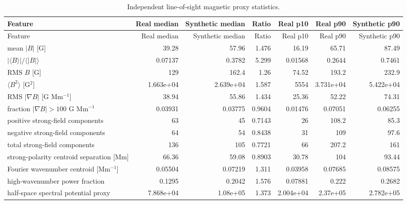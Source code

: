 \scriptsize
\setlength{\tabcolsep}{2pt}
\begin{longtable}{p{}rrrrrr}
\caption{Independent line-of-sight magnetic proxy statistics.}\label{tab:physics-proxy}\\
\toprule
Feature & Real median & Synthetic median & Ratio & Real p10 & Real p90 & Synthetic p90\\
\midrule
\endfirsthead
\toprule
Feature & Real median & Synthetic median & Ratio & Real p10 & Real p90 & Synthetic p90\\
\midrule
\endhead
mean $|B|$ [G] & 39.28 & 57.96 & 1.476 & 16.19 & 65.71 & 87.49\\
$|\langle B\rangle|/\langle|B|\rangle$ & 0.07137 & 0.3782 & 5.299 & 0.01568 & 0.2644 & 0.7461\\
RMS $B$ [G] & 129 & 162.4 & 1.26 & 74.52 & 193.2 & 232.9\\
$\langle B^2\rangle$ [G$^2$] & 1.663e+04 & 2.639e+04 & 1.587 & 5554 & 3.731e+04 & 5.422e+04\\
RMS $|\nabla B|$ [G Mm$^{-1}$] & 38.94 & 55.86 & 1.434 & 25.36 & 52.22 & 74.31\\
fraction $|\nabla B|>100$ G Mm$^{-1}$ & 0.03931 & 0.03775 & 0.9604 & 0.01476 & 0.07051 & 0.06255\\
positive strong-field components & 63 & 45 & 0.7143 & 26 & 108.2 & 85.3\\
negative strong-field components & 64 & 54 & 0.8438 & 31 & 109 & 97.6\\
total strong-field components & 136 & 105 & 0.7721 & 66 & 207.2 & 161\\
strong-polarity centroid separation [Mm] & 66.36 & 59.08 & 0.8903 & 30.78 & 104 & 93.44\\
Fourier wavenumber centroid [Mm$^{-1}$] & 0.05504 & 0.07219 & 1.311 & 0.03958 & 0.07685 & 0.08575\\
high-wavenumber power fraction & 0.1295 & 0.2042 & 1.576 & 0.07881 & 0.222 & 0.2682\\
half-space spectral potential proxy & 7.868e+04 & 1.08e+05 & 1.373 & 2.004e+04 & 2.37e+05 & 2.782e+05\\
\bottomrule
\end{longtable}
\setlength{\tabcolsep}{6pt}
\normalsize
